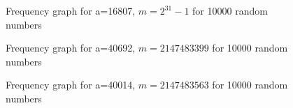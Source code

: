 \documentclass[11pt]{article}
\begin{document}
\begin{figure}[H]
	\centering
	\caption{Frequency graph for a=16807, $m=2^{31}-1$ for 10000 random numbers}
\end{figure}
\begin{figure}[H]
	\centering
	\caption{Frequency graph for a=40692, $m=2147483399$ for 10000 random numbers}
\end{figure}
\begin{figure}[H]
	\centering
	\caption{Frequency graph for a=40014, $m=2147483563$ for 10000 random numbers}
\end{figure}
\end{document}
